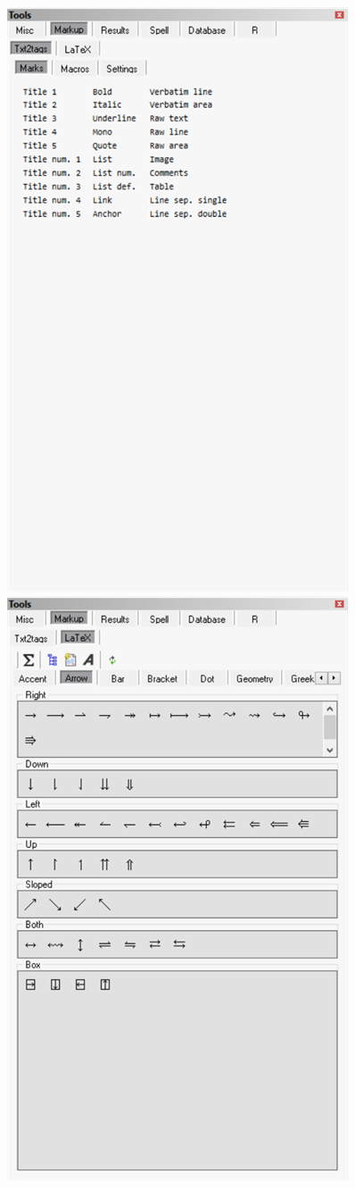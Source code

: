 \begin{figure}[H]
  \includegraphics[scale=0.6]{./res/tools_markup_txt2tags_marks.png}~~
  \includegraphics[scale=0.6]{./res/tools_markup_latex_arrows.png}\\

\end{figure}

